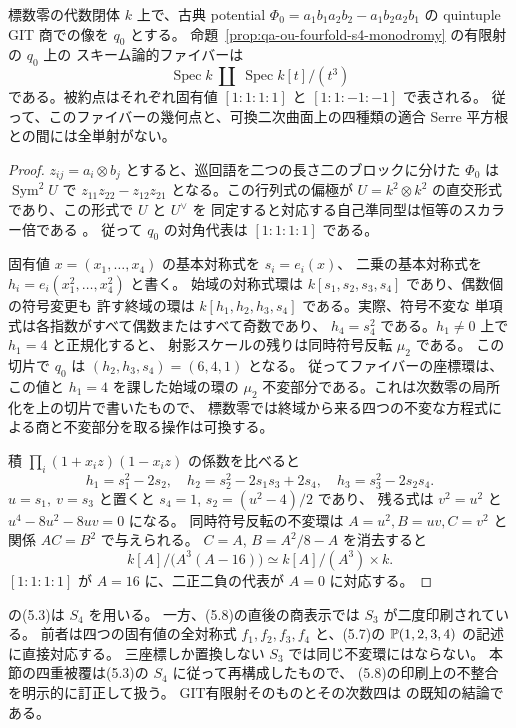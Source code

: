 \begin{corollary}
\label{cor:qa-ou-classical-scheme-fiber}
標数零の代数閉体 $k$ 上で、古典 potential
$\Phi_0=a_1b_1a_2b_2-a_1b_2a_2b_1$ の quintuple GIT 商での像を $q_0$ とする。
命題~\ref{prop:qa-ou-fourfold-s4-monodromy} の有限射の $q_0$ 上の
スキーム論的ファイバーは
\[
 \operatorname{Spec} k\ \amalg\ \operatorname{Spec} k[t]/(t^3)
\]
である。被約点はそれぞれ固有値 $[1:1:1:1]$ と $[1:1:-1:-1]$ で表される。
従って、このファイバーの幾何点と、可換二次曲面上の四種類の適合
Serre 平方根 \cite[\texttt{thm:commutative-four-roots}]{QuadricIntrinsic2026}
との間には全単射がない。
\end{corollary}
\begin{proof}
$z_{ij}=a_i\otimes b_j$ とすると、巡回語を二つの長さ二のブロックに分けた
$\Phi_0$ は $\operatorname{Sym}^2 U$ で
$z_{11}z_{22}-z_{12}z_{21}$ となる。この行列式の偏極が
$U=k^2\otimes k^2$ の直交形式であり、この形式で $U$ と $U^\vee$ を
同定すると対応する自己準同型は恒等のスカラー倍である
\cite[(1.2), (3.5)--(3.9), (5.1)--(5.8)]{OU2014}。
従って $q_0$ の対角代表は $[1:1:1:1]$ である。

固有値 $x=(x_1,\ldots,x_4)$ の基本対称式を $s_i=e_i(x)$、
二乗の基本対称式を $h_i=e_i(x_1^2,\ldots,x_4^2)$ と書く。
始域の対称式環は $k[s_1,s_2,s_3,s_4]$ であり、偶数個の符号変更も
許す終域の環は $k[h_1,h_2,h_3,s_4]$ である。実際、符号不変な
単項式は各指数がすべて偶数またはすべて奇数であり、
$h_4=s_4^2$ である。$h_1\ne0$ 上で $h_1=4$ と正規化すると、
射影スケールの残りは同時符号反転 $\mu_2$ である。
この切片で $q_0$ は $(h_2,h_3,s_4)=(6,4,1)$ となる。
従ってファイバーの座標環は、この値と $h_1=4$ を課した始域の環の
$\mu_2$ 不変部分である。これは次数零の局所化を上の切片で書いたもので、
標数零では終域から来る四つの不変な方程式による商と不変部分を取る操作は可換する。

積 $\prod_i(1+x_i z)(1-x_i z)$ の係数を比べると
\[
 h_1=s_1^2-2s_2,\quad h_2=s_2^2-2s_1s_3+2s_4,\quad
 h_3=s_3^2-2s_2s_4 .
\]
$u=s_1,\ v=s_3$ と置くと $s_4=1$, $s_2=(u^2-4)/2$ であり、
残る式は $v^2=u^2$ と $u^4-8u^2-8uv=0$ になる。
同時符号反転の不変環は $A=u^2,B=uv,C=v^2$ と関係 $AC=B^2$ で与えられる。
$C=A$, $B=A^2/8-A$ を消去すると
\[
 k[A]/\bigl(A^3(A-16)\bigr)
 \simeq k[A]/(A^3)\times k .
\]
$[1:1:1:1]$ が $A=16$ に、二正二負の代表が $A=0$ に対応する。
\end{proof}

\begin{remark}
\label{rem:qa-ou-source-s3-s4-discrepancy}
\cite[\S5, p.~9]{OU2014} の(5.3)は $S_4$ を用いる。
一方、(5.8)の直後の商表示では
$S_3$ が二度印刷されている。
前者は四つの固有値の全対称式
$f_1,f_2,f_3,f_4$ と、(5.7)の
$\mathbb P(1,2,3,4)$ の記述に直接対応する。
三座標しか置換しない $S_3$ では同じ不変環にはならない。
本節の四重被覆は(5.3)の $S_4$ に従って再構成したもので、
(5.8)の印刷上の不整合を明示的に訂正して扱う。
GIT有限射そのものとその次数四は
\cite[Theorem~1.1(4)]{OU2014} の既知の結論である。
\end{remark}

